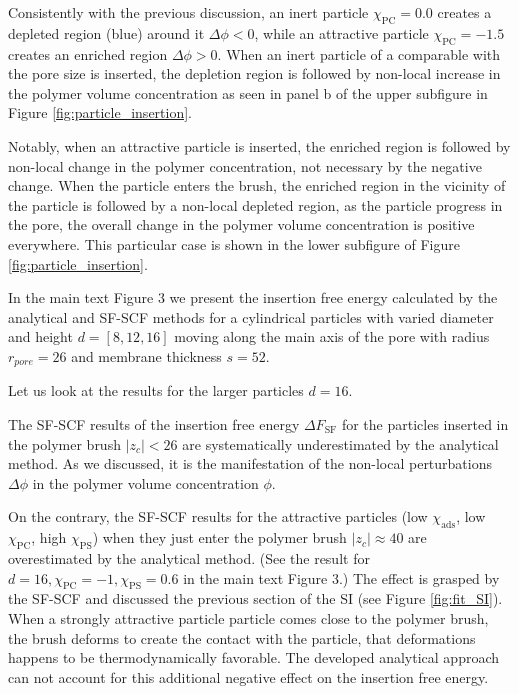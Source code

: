 \documentclass[10pt, a4paper]{article}
\begin{document}
\begin{multicols}{2}
Consistently with the previous discussion, an inert particle $\chi_{\textrm{PC}} = 0.0$ creates a depleted region (blue) around it $\Delta \phi < 0$, while an attractive particle $\chi_{\textrm{PC}} = -1.5$ creates an enriched region $\Delta \phi > 0$.
When an inert particle of a comparable with the pore size is inserted, the depletion region is followed by non-local increase in the polymer volume concentration as seen in panel b of the upper subfigure in Figure \ref{fig:particle_insertion}.

Notably, when an attractive particle is inserted, the enriched region is followed by non-local change in the polymer concentration, not necessary by the negative change.
When the particle enters the brush, the enriched region in the vicinity of the particle is followed by a non-local depleted region, as the particle progress in the pore, the overall change in the polymer volume concentration is positive everywhere.
This particular case is shown in the lower subfigure of Figure \ref{fig:particle_insertion}.

In the main text Figure 3 we present the insertion free energy calculated by the analytical and SF-SCF methods for a cylindrical particles with varied diameter and height $d=[8, 12, 16]$ moving along the main axis of the pore with radius $r_{pore} = 26$ and membrane thickness $s=52$.

Let us look at the results for the larger particles $d = 16$.

The SF-SCF results of the insertion free energy $\Delta F_{\textrm{SF}}$ for the particles inserted in the polymer brush $|z_c| < 26$ are systematically underestimated by the analytical method. 
As we discussed, it is the manifestation of the non-local perturbations $\Delta \phi$ in the polymer volume concentration $\phi$.

On the contrary, the SF-SCF results for the attractive particles (low $\chi_{\textrm{ads}}$, low $\chi_{\textrm{PC}}$, high $\chi_{\textrm{PS}}$) when they just enter the polymer brush $|z_c| \approx 40$ are overestimated by the analytical method.
(See the result for $d=16, \chi_{\textrm{PC}} = -1, \chi_{\textrm{PS}} = 0.6$ in the main text Figure 3.)
The effect is grasped by the SF-SCF and discussed the previous section of the SI (see Figure \ref{fig:fit_SI}).
When a strongly attractive particle particle comes close to the polymer brush, the brush deforms to create the contact with the particle, that deformations happens to be thermodynamically favorable.
The developed analytical approach can not account for this additional negative effect on the insertion free energy.

\end{multicols}
\end{document}
